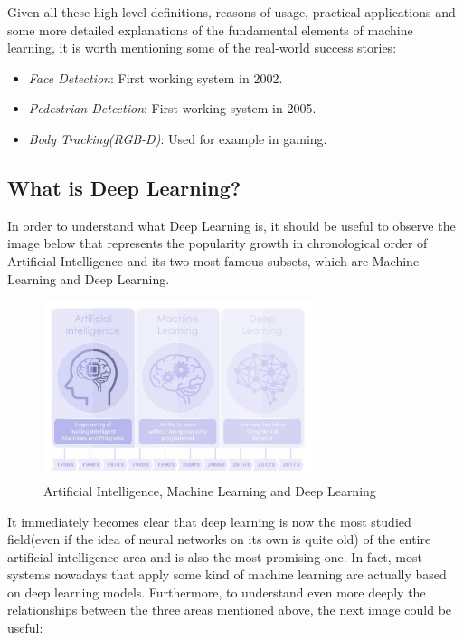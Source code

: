\vspace{5mm}

Given all these high-level definitions, reasons of usage, practical
applications and some more detailed explanations of the fundamental
elements of machine learning, it is worth mentioning some of the
real-world success stories:

\begin{itemize}
    \item \emph{Face Detection}: First working system in 2002.
    \item \emph{Pedestrian Detection}: First working system in 2005.
    \item \emph{Body Tracking(RGB-D)}: Used for example in gaming.
\end{itemize}

\newpage

\subsection{What is Deep Learning?}

In order to understand what Deep Learning is, it should be useful to
observe the image below that represents the popularity growth in
chronological order of Artificial Intelligence and its two most famous
subsets, which are Machine Learning and Deep Learning.

\begin{figure}[h]
    \centering
    \includegraphics[width=0.7\textwidth]{../img/AI_ML_DL_1}
    \caption{Artificial Intelligence, Machine Learning and Deep Learning}
\end{figure}

It immediately becomes clear that deep learning is now the most
studied field(even if the idea of neural networks on its own is quite
old) of the entire artificial intelligence area and is also the
most promising one. In fact, most systems nowadays that apply some
kind of machine learning are actually based on deep learning models.
Furthermore, to understand even more deeply the relationships between
the three areas mentioned above, the next image could be useful:

